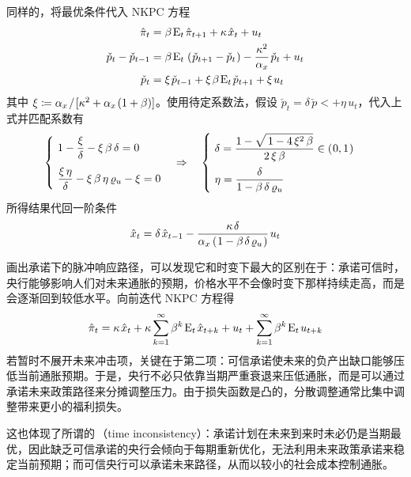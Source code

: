 同样的，将最优条件代入 NKPC 方程
\begin{align*}
    \hat\pi_t &= \beta\,\meant\,\hat\pi\nt + \kappa\,\hat x_t + u_t\\
    \check p_t - \check p\lt &= \beta\,\meant\,\bka{\check p\nt - \check p_t} - \dfrac{\kappa^2}{\alpha_x}\,\check p_t + u_t \\
    \check p_t &= \xi\,\check p\lt + \xi\,\beta\,\meant\,\check p\nt + \xi\,u_t
\end{align*}
其中 \(\xi\coloneq\alpha_x\islash[\kappa^2+\alpha_x\,(1+\beta)]\)。使用待定系数法，假设 \(\check p_t = \delta\,\check p\lt + \eta\,u_t\)，代入上式并匹配系数有
\begin{align*}
    \begin{cases}
        \ 1-\dfrac\xi\delta-\xi\,\beta\,\delta=0\\[10pt]
        \ \dfrac{\xi\,\eta}\delta-\xi\,\beta\,\eta\,\varrho_u-\xi=0
    \end{cases}\Rightarrow\quad
    \begin{cases}
        \ \delta=\dfrac{1-\dsq{1-4\,\xi^2\,\beta}}{2\,\xi\,\beta}\in\bka{0,1}\\[10pt]
        \ \eta=\dfrac{\delta}{1-\beta\,\delta\,\varrho_u}
    \end{cases}
\end{align*}
所得结果代回一阶条件
\begin{align*}
    \hat x_t=\delta\,\hat x\lt-\dfrac{\kappa\,\delta}{\alpha_x\bka{1-\beta\,\delta\,\varrho_u}}\,u_t
\end{align*}

画出承诺下的脉冲响应路径，可以发现它和时变下最大的区别在于：承诺可信时，央行能够影响人们对未来通胀的预期，价格水平不会像时变下那样持续走高，而是会逐渐回到较低水平。向前迭代 NKPC 方程得
\begin{align*}
    \hat\pi_t
    =\kappa\,\hat x_t
    +\kappa\sum_{k=1}^{\infty}\beta^k\,\meant\,\hat x_{t+k}
    +u_t+\sum_{k=1}^{\infty}\beta^k\,\meant\,u_{t+k}
\end{align*}
若暂时不展开未来冲击项，关键在于第二项：可信承诺使未来的负产出缺口能够压低当前通胀预期。于是，央行不必只依靠当期严重衰退来压低通胀，而是可以通过承诺未来政策路径来分摊调整压力。由于损失函数是凸的，分散调整通常比集中调整带来更小的福利损失。

这也体现了所谓的\,（time inconsistency）：承诺计划在未来到来时未必仍是当期最优，因此缺乏可信承诺的央行会倾向于每期重新优化，无法利用未来政策承诺来稳定当前预期；而可信央行可以承诺未来路径，从而以较小的社会成本控制通胀。

